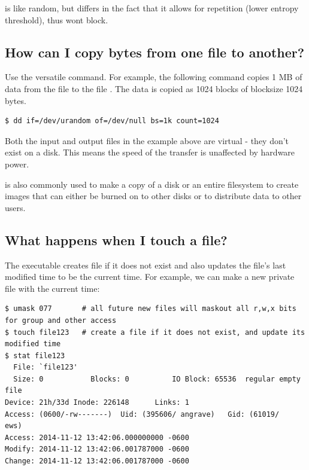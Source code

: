  is like random, but differs in the fact that it allows for repetition (lower entropy threshold), thus wont block.

\subsection{How can I copy bytes from one file to another?}\label{how-can-i-copy-bytes-from-one-file-to-another}

Use the versatile  command. For example, the following command copies 1 MB of data from the file  to the file . The data is copied as 1024 blocks of blocksize 1024 bytes.

\begin{lstlisting}
$ dd if=/dev/urandom of=/dev/null bs=1k count=1024
\end{lstlisting}

Both the input and output files in the example above are virtual - they don't exist on a disk. This means the speed of the transfer is unaffected by hardware power.

 is also commonly used to make a copy of a disk or an entire filesystem to create images that can either be burned on to other disks or to distribute data to other users.

\subsection{What happens when I touch a file?}\label{what-happens-when-i-touch-a-file}

The  executable creates file if it does not exist and also updates the file's last modified time to be the current time. For example, we can make a new private file with the current time:

\begin{lstlisting}
$ umask 077       # all future new files will maskout all r,w,x bits for group and other access
$ touch file123   # create a file if it does not exist, and update its modified time
$ stat file123
  File: `file123'
  Size: 0           Blocks: 0          IO Block: 65536  regular empty file
Device: 21h/33d Inode: 226148      Links: 1
Access: (0600/-rw-------)  Uid: (395606/ angrave)   Gid: (61019/     ews)
Access: 2014-11-12 13:42:06.000000000 -0600
Modify: 2014-11-12 13:42:06.001787000 -0600
Change: 2014-11-12 13:42:06.001787000 -0600
\end{lstlisting}

